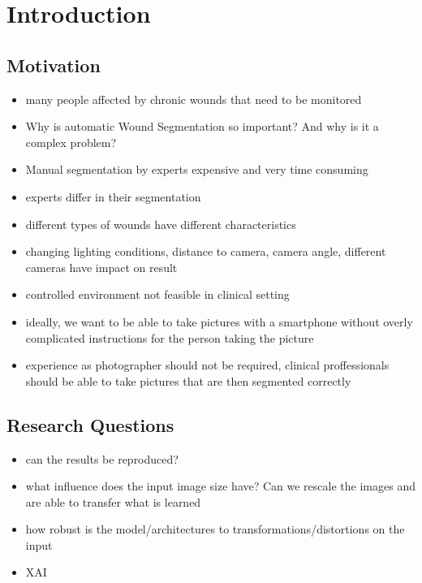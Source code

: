 \section{Introduction}

\subsection{Motivation}

\begin{itemize}
	\item many people affected by chronic wounds that need to be monitored
	\item Why is automatic Wound Segmentation so important? And why is it a complex problem?
	\item Manual segmentation by experts expensive and very time consuming
	\item experts differ in their segmentation
	\item different types of wounds have different characteristics
	\item changing lighting conditions, distance to camera, camera angle, different cameras have impact on result
	\item controlled environment not feasible in clinical setting
	\item ideally, we want to be able to take pictures with a smartphone without overly complicated instructions for the person taking the picture
	\item experience as photographer should not be required, clinical proffessionals should be able to take pictures that are then segmented correctly
\end{itemize}


\subsection{Research Questions}

\begin{itemize}
	\item can the results be reproduced?
	\item what influence does the input image size have? Can we rescale the images and are able to transfer what is learned
	\item how robust is the model/architectures to transformations/distortions on the input
	\item XAI
\end{itemize}